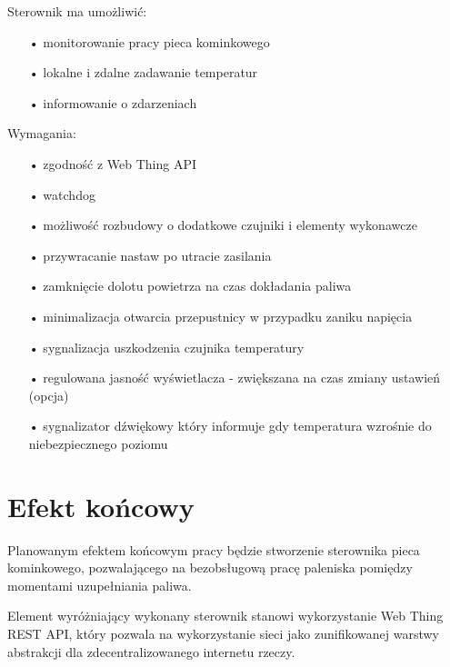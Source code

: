 \documentclass[12pt]{report}
\begin{document}
 Sterownik ma umożliwić:
 \begin{enumerate}
 \item[•] monitorowanie pracy pieca kominkowego
 \item[•] lokalne i zdalne zadawanie temperatur
 \item[•] informowanie o zdarzeniach
 \end{enumerate}
 
 Wymagania:
 \begin{enumerate}
 \item[•] zgodność z Web Thing API
 \item[•] watchdog
 \item[•] możliwość rozbudowy o dodatkowe czujniki i elementy wykonawcze
 \item[•] przywracanie nastaw po utracie zasilania
 \item[•] zamknięcie dolotu powietrza na czas dokładania paliwa
 \item[•] minimalizacja otwarcia przepustnicy w przypadku zaniku napięcia
 \item[•] sygnalizacja uszkodzenia czujnika temperatury
 \item[•] regulowana jasność wyświetlacza - zwiększana na czas zmiany ustawień (opcja)
 \item[•] sygnalizator dźwiękowy który informuje gdy temperatura wzrośnie do niebezpiecznego poziomu
 \end{enumerate}
 
  
 
 \section{Efekt końcowy}
 Planowanym efektem końcowym pracy będzie stworzenie sterownika pieca kominkowego, pozwalającego na bezobsługową pracę paleniska pomiędzy momentami uzupełniania paliwa.

 Element wyróżniający wykonany sterownik stanowi wykorzystanie Web Thing REST API, który pozwala na wykorzystanie sieci jako zunifikowanej warstwy abstrakcji dla zdecentralizowanego internetu rzeczy.
 
\end{document}
